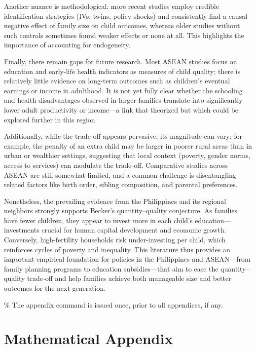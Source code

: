 \documentclass[]{AEA}
\begin{document}
Another nuance is methodological: more recent studies employ credible
identification strategies (IVs, twins, policy shocks) and consistently
find a causal negative effect of family size on child outcomes, whereas
older studies without such controls sometimes found weaker effects or
none at all. This highlights the importance of accounting for
endogeneity.

Finally, there remain gaps for future research. Most ASEAN studies focus
on education and early-life health indicators as measures of child
quality; there is relatively little evidence on long-term outcomes such
as children's eventual earnings or income in adulthood. It is not yet
fully clear whether the schooling and health disadvantages observed in
larger families translate into significantly lower adult productivity or
income---a link that \citet{becker1976child} theorized but which could
be explored further in this region.

Additionally, while the trade-off appears pervasive, its magnitude can
vary: for example, the penalty of an extra child may be larger in poorer
rural areas than in urban or wealthier settings, suggesting that local
context (poverty, gender norms, access to services) can modulate the
trade-off. Comparative studies across ASEAN are still somewhat limited,
and a common challenge is disentangling related factors like birth
order, sibling composition, and parental preferences.

Nonetheless, the prevailing evidence from the Philippines and its
regional neighbors strongly supports Becker's quantity--quality
conjecture. As families have fewer children, they appear to invest more
in each child's education---investments crucial for human capital
development and economic growth. Conversely, high-fertility households
risk under-investing per child, which reinforces cycles of poverty and
inequality. This literature thus provides an important empirical
foundation for policies in the Philippines and ASEAN---from family
planning programs to education subsidies---that aim to ease the
quantity--quality trade-off and help families achieve both manageable
size and better outcomes for the next generation.




\% The appendix command is issued once, prior to all appendices, if any.
\appendix

\section{Mathematical Appendix}
\end{document}
